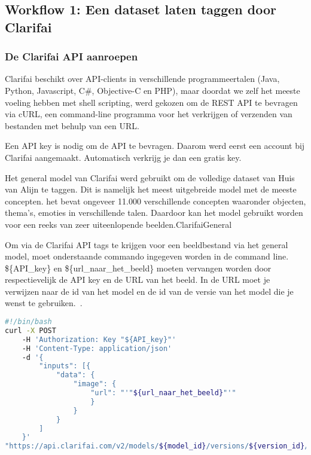 \subsection{Workflow 1: Een dataset laten taggen door Clarifai}
\label{subsec:workflow1}

\subsubsection{De Clarifai API aanroepen}
\label{(subsubsec:clarifai-aanroepen)}

Clarifai beschikt over API-clients in verschillende programmeertalen (Java, Python, Javascript, C\#, Objective-C en PHP), maar doordat we zelf het meeste voeling hebben met shell scripting, werd gekozen om de REST API te bevragen via cURL, een command-line programma voor het verkrijgen of verzenden van bestanden met behulp van  een URL.

Een API key is nodig om de API te bevragen. Daarom werd eerst een account bij Clarifai aangemaakt. Automatisch verkrijg je dan een gratis key. 


Het general model van Clarifai werd gebruikt om de volledige dataset van Huis van Alijn te taggen. Dit is namelijk het meest uitgebreide model met de meeste concepten. het bevat ongeveer 11.000 verschillende concepten waaronder objecten, thema's, emoties in verschillende talen. Daardoor kan het model gebruikt worden voor een reeks van zeer uiteenlopende beelden.{ClarifaiGeneral}

Om via de Clarifai API tags te krijgen voor een beeldbestand via het general model, moet onderstaande commando ingegeven worden in de command line. \$\{API\_key\} en \$\{url\_naar\_het\_beeld\} moeten vervangen worden door respectievelijk de API key en de URL van het beeld. In de URL moet je verwijzen naar de id van het model en de id van de versie van het model die je wenst te gebruiken.~\autocite{ClarifaiAPI}. %

\begin{lstlisting}[language=bash,caption=bash commando om een beeld door Clarifai te laten taggen.]
#!/bin/bash
curl -X POST
    -H 'Authorization: Key "${API_key}"'
    -H 'Content-Type: application/json'
    -d '{
        "inputs": [{
            "data": {
                "image": { 
                    "url": "'"${url_naar_het_beeld}"'"
                    }
                }
            }
        ]
    }'
"https://api.clarifai.com/v2/models/${model_id}/versions/${version_id}/outputs"
\end{lstlisting}

